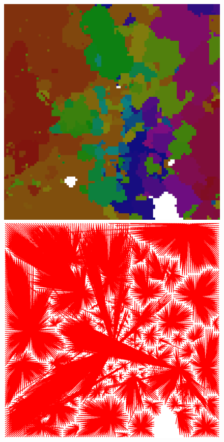 \documentclass[12pt,a4paper]{article}
\begin{document}
\begin{figure}[h]
\centering
\includegraphics[scale=0.4]{monday.png}
\caption{}
\label{fig:patch_mon}




\includegraphics[scale=0.2]{clusters.png}
\caption{}
\label{fig:arcs_mon}





\end{figure}
\end{document}
